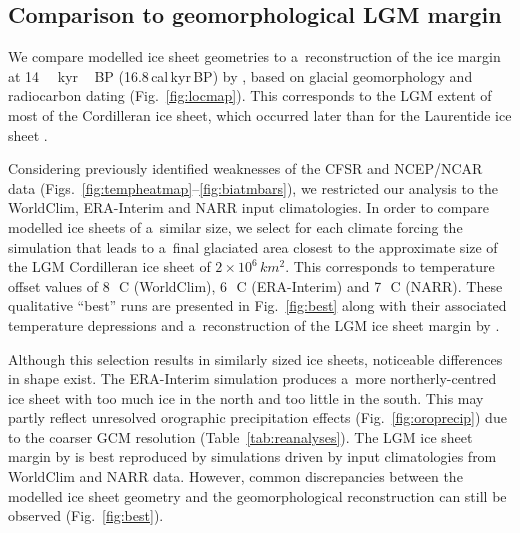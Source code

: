 \documentclass[tc, ms]{copernicus}
\begin{document}
\subsection{Comparison to geomorphological LGM margin}

We compare modelled ice sheet geometries to a~reconstruction of the ice margin at 14\,\unit{\,kyr\,BP} (16.8\,cal\,kyr\,BP) by \citet{dyke-2004}, based on glacial geomorphology and radiocarbon dating (Fig.~\ref{fig:locmap}). This corresponds to the LGM extent of most of the Cordilleran ice sheet, which occurred later than for the Laurentide ice sheet \citep{porter-swanson-1998,dyke-2004,stroeven-etal-2010,stroeven-etal-inpress}.

Considering previously identified weaknesses of the CFSR and NCEP/NCAR data (Figs.~\ref{fig:tempheatmap}--\ref{fig:biatmbars}), we restricted our analysis to the WorldClim, ERA-Interim and NARR input climatologies. In order to compare modelled ice sheets of a~similar size, we select for each climate forcing the simulation that leads to a~final glaciated area closest to the approximate size of the LGM Cordilleran ice sheet of $2\times 10^6\,\unit{km^2}$. This corresponds to temperature offset values of 8\,\unit{{\degree}C} (WorldClim), 6\,\unit{{\degree}C} (ERA-Interim) and 7\,\unit{{\degree}C} (NARR). These qualitative “best” runs are presented in Fig.~\ref{fig:best} along with their associated temperature depressions and a~reconstruction of the LGM ice sheet margin by \citet{dyke-2004}.

Although this selection results in similarly sized ice sheets, noticeable differences in shape exist. The ERA-Interim simulation produces a~more northerly-centred ice sheet with too much ice in the north and too little in the south. This may partly reflect unresolved orographic precipitation effects (Fig.~\ref{fig:oroprecip}) due to the coarser GCM resolution (Table~\ref{tab:reanalyses}). The LGM ice sheet margin by \citet{dyke-2004} is best reproduced by simulations driven by input climatologies from WorldClim and NARR data. However, common discrepancies between the modelled ice sheet geometry and the geomorphological reconstruction can still be observed (Fig.~\ref{fig:best}).
\end{document}
